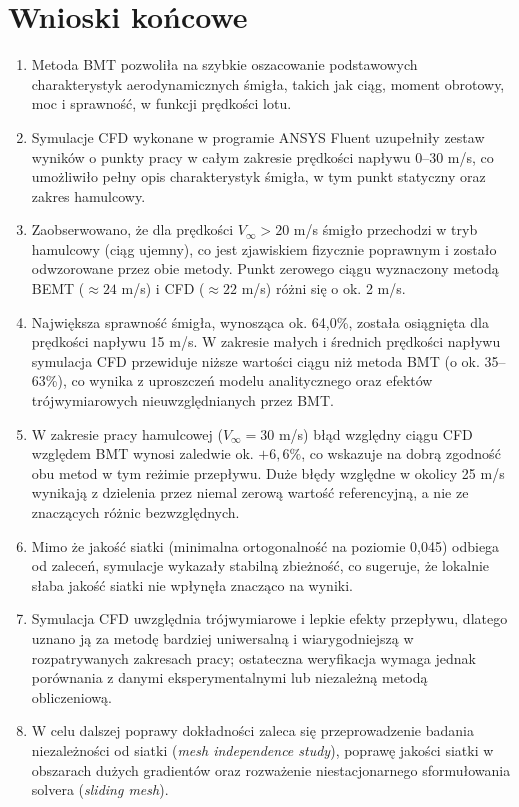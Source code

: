 \documentclass[12pt,a4paper,twoside]{article}
\begin{document}
	\newpage
	\section{Wnioski końcowe}
	\begin{enumerate}
		\item Metoda BMT pozwoliła na szybkie oszacowanie podstawowych charakterystyk aerodynamicznych śmigła, takich jak ciąg, moment obrotowy, moc i sprawność, w funkcji prędkości lotu.
		\item Symulacje CFD wykonane w programie ANSYS Fluent uzupełniły zestaw wyników o punkty pracy w całym zakresie prędkości napływu 0--30 m/s, co umożliwiło pełny opis charakterystyk śmigła, w tym punkt statyczny oraz zakres hamulcowy.
		\item Zaobserwowano, że dla prędkości \(V_\infty > 20\) m/s śmigło przechodzi w tryb hamulcowy (ciąg ujemny), co jest zjawiskiem fizycznie poprawnym i zostało odwzorowane przez obie metody. Punkt zerowego ciągu wyznaczony metodą BEMT (\(\approx 24\) m/s) i CFD (\(\approx 22\) m/s) różni się o ok. 2 m/s.
		\item Największa sprawność śmigła, wynosząca ok. 64,0\%, została osiągnięta dla prędkości napływu 15 m/s. W zakresie małych i średnich prędkości napływu symulacja CFD przewiduje niższe wartości ciągu niż metoda BMT (o ok. 35--63\%), co wynika z uproszczeń modelu analitycznego oraz efektów trójwymiarowych nieuwzględnianych przez BMT.
		\item W zakresie pracy hamulcowej (\(V_\infty = 30\) m/s) błąd względny ciągu CFD względem BMT wynosi zaledwie ok. \(+6{,}6\%\), co wskazuje na dobrą zgodność obu metod w tym reżimie przepływu. Duże błędy względne w okolicy 25 m/s wynikają z dzielenia przez niemal zerową wartość referencyjną, a nie ze znaczących różnic bezwzględnych.
		\item Mimo że jakość siatki (minimalna ortogonalność na poziomie 0,045) odbiega od zaleceń, symulacje wykazały stabilną zbieżność, co sugeruje, że lokalnie słaba jakość siatki nie wpłynęła znacząco na wyniki.
		\item Symulacja CFD uwzględnia trójwymiarowe i lepkie efekty przepływu, dlatego uznano ją za metodę bardziej uniwersalną i wiarygodniejszą w rozpatrywanych zakresach pracy; ostateczna weryfikacja wymaga jednak porównania z danymi eksperymentalnymi lub niezależną metodą obliczeniową.
		\item W celu dalszej poprawy dokładności zaleca się przeprowadzenie badania niezależności od siatki (\textit{mesh independence study}), poprawę jakości siatki w obszarach dużych gradientów oraz rozważenie niestacjonarnego sformułowania solvera (\textit{sliding mesh}).
	\end{enumerate}
	
\end{document}
